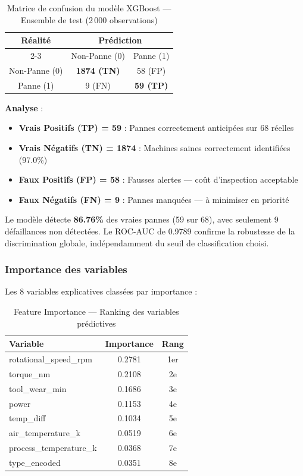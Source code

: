 \documentclass[a4paper,12pt]{report}
\begin{document}
\begin{table}[H]
\centering
\small
\caption{Matrice de confusion du modèle XGBoost — Ensemble de test (2\,000 observations)}
\begin{tabular}{|c|c|c|}
\hline
\multirow{2}{*}{\textbf{Réalité}} & \multicolumn{2}{c|}{\textbf{Prédiction}} \\
\cline{2-3}
& Non-Panne (0) & Panne (1) \\
\hline
Non-Panne (0) & \textbf{1874 (TN)} & 58 (FP) \\
\hline
Panne (1) & 9 (FN) & \textbf{59 (TP)} \\
\hline
\end{tabular}

\textbf{Analyse} :
\begin{itemize}
    \item \textbf{Vrais Positifs (TP) = 59} : Pannes correctement anticipées sur 68 réelles
    \item \textbf{Vrais Négatifs (TN) = 1874} : Machines saines correctement identifiées (97.0\%)
    \item \textbf{Faux Positifs (FP) = 58} : Fausses alertes — coût d'inspection acceptable
    \item \textbf{Faux Négatifs (FN) = 9} : Pannes manquées — à minimiser en priorité
\end{itemize}

Le modèle détecte \textbf{86.76\%} des vraies pannes (59 sur 68), avec seulement 9 défaillances
non détectées. Le ROC-AUC de 0.9789 confirme la robustesse de la discrimination globale,
indépendamment du seuil de classification choisi.
\end{table}

\subsubsection{Importance des variables}

Les 8 variables explicatives classées par importance :

\begin{table}[H]
\centering
\small
\caption{Feature Importance — Ranking des variables prédictives}
\begin{tabular}{|l|c|c|}
\hline
\textbf{Variable} & \textbf{Importance} & \textbf{Rang} \\
\hline\hline
rotational\_speed\_rpm & 0.2781 & 1er \\
\hline
torque\_nm & 0.2108 & 2e \\
\hline
tool\_wear\_min & 0.1686 & 3e \\
\hline
power & 0.1153 & 4e \\
\hline
temp\_diff & 0.1034 & 5e \\
\hline
air\_temperature\_k & 0.0519 & 6e \\
\hline
process\_temperature\_k & 0.0368 & 7e \\
\hline
type\_encoded & 0.0351 & 8e \\
\hline
\end{tabular}
\end{table}
\end{document}
